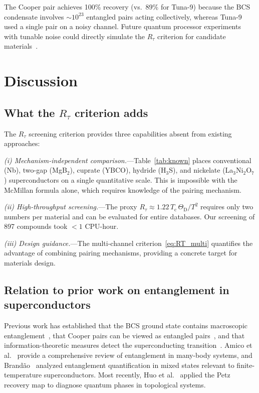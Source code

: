 \documentclass[prb,twocolumn,superscriptaddress,longbibliography,floatfix]{revtex4-2}
\newcommand{\tauasym}{\tau}
\newcommand{\Rtau}{R_{\tauasym}}
\newcommand{\Tc}{T_{\mathrm{c}}}
\newcommand{\ThetaD}{\Theta_{\mathrm{D}}}
\begin{document}
The Cooper pair achieves 100\% recovery (vs.\ 89\% for Tuna-9)
because the BCS condensate involves $\sim 10^{23}$ entangled
pairs acting collectively, whereas Tuna-9 used a single pair
on a noisy channel.  Future quantum processor experiments with
tunable noise could directly simulate the $\Rtau$ criterion for
candidate materials~\cite{Huang2026exp}.

\section{Discussion}
\label{sec:discussion}

\subsection{What the $\Rtau$ criterion adds}

The $\Rtau$ screening criterion provides three capabilities
absent from existing approaches:

\emph{(i) Mechanism-independent comparison.}---Table~\ref{tab:known}
places conventional (Nb), two-gap (MgB$_2$), cuprate (YBCO),
hydride (H$_3$S), and nickelate (La$_3$Ni$_2$O$_7$)
superconductors on a single quantitative scale.
This is impossible with the McMillan formula alone, which
requires knowledge of the pairing mechanism.

\emph{(ii) High-throughput screening.}---The proxy
$\Rtau \approx 1.22\, \Tc\, \ThetaD / T^2$ requires only two
numbers per material and can be evaluated for entire databases.
Our screening of 897 compounds took $< 1$ CPU-hour.

\emph{(iii) Design guidance.}---The multi-channel
criterion~\eqref{eq:RT_multi} quantifies the advantage of
combining pairing mechanisms, providing a concrete target
for materials design.

\subsection{Relation to prior work on entanglement in superconductors}

Previous work has established that the BCS ground state contains
macroscopic entanglement~\cite{Vedral2004,Dunning2005}, that
Cooper pairs can be viewed as entangled
pairs~\cite{OhKim2004,Botero2004}, and that information-theoretic
measures detect the superconducting
transition~\cite{Ding2021}.  Amico et al.~\cite{Amico2008}
provide a comprehensive review of entanglement in
many-body systems, and Brand\~ao~\cite{Brandao2005} analyzed
entanglement quantification in mixed states relevant to
finite-temperature superconductors.  Most recently,
Huo et al.~\cite{Huo2024} applied the Petz recovery map to
diagnose quantum phases in topological systems.
\end{document}

